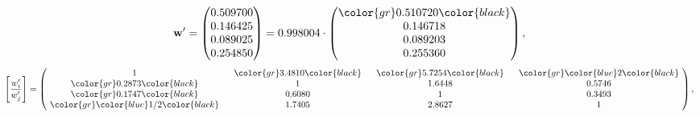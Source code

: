 \begin{example}
\begin{equation*}
\mathbf{w}^{\prime} =
\begin{pmatrix}
0.509700\\
0.146425\\
0.089025\\
0.254850
\end{pmatrix} =
0.998004\cdot
\begin{pmatrix}
\color{gr} 0.510720\color{black} \\
0.146718\\
0.089203\\
0.255360
\end{pmatrix},
\end{equation*}
\begin{equation*}
\left[ \frac{{w}^{\prime}_i}{{w}^{\prime}_j} \right] =
\begin{pmatrix}
$\,\,$ 1 $\,\,$ & $\,\,$\color{gr} 3.4810\color{black} $\,\,$ & $\,\,$\color{gr} 5.7254\color{black} $\,\,$ & $\,\,$\color{gr} \color{blue} 2\color{black} $\,\,$ \\
$\,\,$\color{gr} 0.2873\color{black} $\,\,$ & $\,\,$ 1 $\,\,$ & $\,\,$1.6448$\,\,$ & $\,\,$0.5746  $\,\,$ \\
$\,\,$\color{gr} 0.1747\color{black} $\,\,$ & $\,\,$0.6080$\,\,$ & $\,\,$ 1 $\,\,$ & $\,\,$0.3493 $\,\,$ \\
$\,\,$\color{gr} \color{blue}  1/2\color{black} $\,\,$ & $\,\,$1.7405$\,\,$ & $\,\,$2.8627$\,\,$ & $\,\,$ 1  $\,\,$ \\
\end{pmatrix},
\end{equation*}
\end{example}
\newpage
